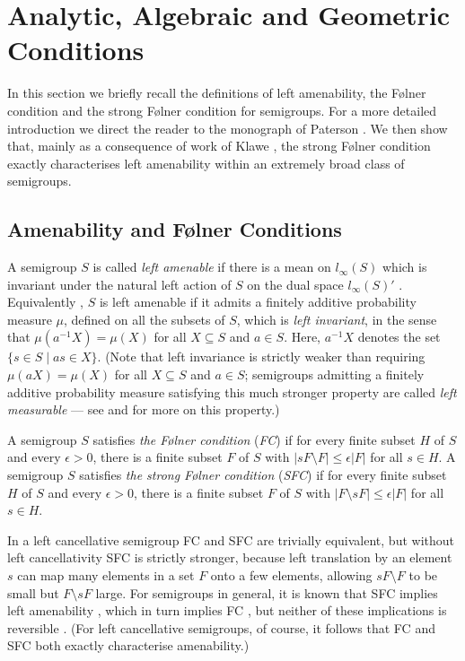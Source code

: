 \documentclass[11pt,a4paper,reqno]{amsart}
\begin{document}
\section{Analytic, Algebraic and Geometric Conditions}

In this section we briefly recall the definitions of left amenability, the
F\o lner condition and the strong F\o lner condition for semigroups. For
a more detailed introduction we direct the reader to the monograph
of Paterson \cite{Paterson88}. We then show that, mainly as a consequence
of work of Klawe \cite{Klawe77}, the strong F\o lner condition
exactly characterises left amenability within an extremely broad class
of semigroups.

\subsection{Amenability and F\o lner Conditions}
A semigroup $S$ is called \textit{left amenable} if there is a mean
on $l_\infty(S)$ which is invariant under the natural left action
of $S$ on the dual space $l_\infty(S)'$ \cite[Section 0.18]{Paterson88}.
Equivalently \cite[Problem 0.32]{Paterson88}, $S$ is left amenable if
it admits a finitely additive probability measure $\mu$,
defined on all the subsets of $S$, which is \textit{left invariant},
in the sense
that $\mu(a^{-1} X) = \mu(X)$ for all $X \subseteq S$ and $a \in S$. Here,
$a^{-1} X$ denotes the set $\lbrace s \in S \mid as \in X \rbrace$. (Note that
left invariance is strictly weaker than requiring
$\mu(aX) = \mu(X)$ for all $X \subseteq S$ and $a \in S$; semigroups
admitting a finitely additive probability measure satisfying this
much stronger property are called \textit{left measurable} --- see \cite{Sorenson66}
and \cite[Section~5]{Klawe77} for more on this property.)

A semigroup $S$ satisfies \textit{the F\o lner condition} (\textit{FC})
if for every finite subset $H$ of $S$ and every $\epsilon > 0$, there
is a finite subset $F$ of $S$ with $|sF \setminus F| \leq \epsilon |F|$ for
all $s \in H$.
A semigroup $S$ satisfies \textit{the strong F\o lner condition} (\textit{SFC})
if for every finite subset $H$ of $S$ and every $\epsilon > 0$, there
is a finite subset $F$ of $S$ with $|F \setminus sF| \leq \epsilon |F|$
for all $s \in H$.

In a left cancellative semigroup FC and SFC are trivially equivalent,
but without left cancellativity SFC is strictly stronger, because
left translation by an element $s$ can map many elements in a set
$F$ onto a few elements, allowing $sF \setminus F$ to be small
but $F \setminus sF$ large. For semigroups in general, it is known that
SFC implies left amenability \cite{Argabright67}, which in turn
implies FC \cite{Day57}, but neither of these implications is reversible
\cite{Day57,Klawe77}. (For left cancellative semigroups, of course, it
follows that FC and SFC both exactly characterise amenability.)
\end{document}
